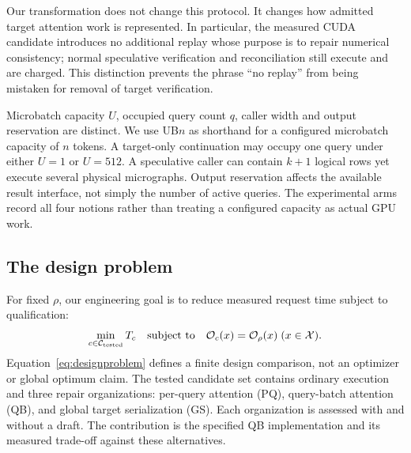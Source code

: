 Our transformation does not change this protocol. It changes how admitted target attention work is represented. In particular, the measured CUDA candidate introduces no additional replay whose purpose is to repair numerical consistency; normal speculative verification and reconciliation still execute and are charged. This distinction prevents the phrase ``no replay'' from being mistaken for removal of target verification.

Microbatch capacity $U$, occupied query count $q$, caller width and output reservation are distinct. We use UB$n$ as shorthand for a configured microbatch capacity of $n$ tokens. A target-only continuation may occupy one query under either $U=1$ or $U=512$. A speculative caller can contain $k+1$ logical rows yet execute several physical micrographs. Output reservation affects the available result interface, not simply the number of active queries. The experimental arms record all four notions rather than treating a configured capacity as actual GPU work.

\subsection{The design problem}
For fixed $\rho$, our engineering goal is to reduce measured request time subject to qualification:
\begin{equation}
\min_{c\in\mathcal C_{\rm tested}} T_c
\quad\text{subject to}\quad
\mathcal O_c(x)=\mathcal O_\rho(x)\;(x\in\mathcal X).
\label{eq:designproblem}
\end{equation}
Equation~\eqref{eq:designproblem} defines a finite design comparison, not an optimizer or global optimum claim. The tested candidate set contains ordinary execution and three repair organizations: per-query attention (PQ), query-batch attention (QB), and global target serialization (GS). Each organization is assessed with and without a draft. The contribution is the specified QB implementation and its measured trade-off against these alternatives.
